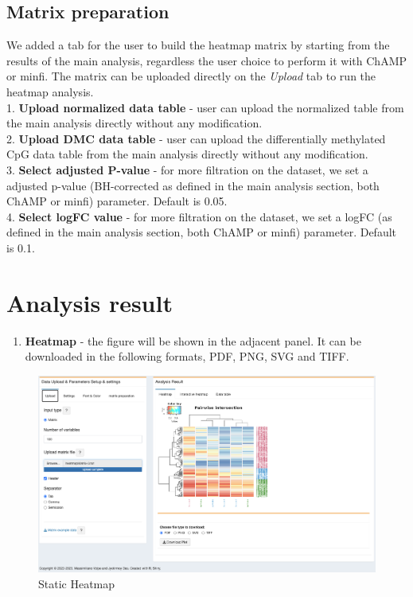 \documentclass[
  a4paper,
  oneside,
  open=any]{scrreport}
\providecommand{\tightlist}{%
  \setlength{\itemsep}{0pt}\setlength{\parskip}{0pt}}\usepackage{longtable,booktabs,array}
\begin{document}
\hypertarget{matrix-preparation}{%
\subsection{Matrix preparation}\label{matrix-preparation}}

We added a tab for the user to build the heatmap matrix by starting from
the results of the main analysis, regardless the user choice to perform
it with ChAMP or minfi. The matrix can be uploaded directly on the
\emph{Upload} tab to run the heatmap analysis.\\
1. \textbf{Upload normalized data table} - user can upload the
normalized table from the main analysis directly without any
modification.\\
2. \textbf{Upload DMC data table} - user can upload the differentially
methylated CpG data table from the main analysis directly without any
modification.\\
3. \textbf{Select adjusted P-value} - for more filtration on the
dataset, we set a adjusted p-value (BH-corrected as defined in the main
analysis section, both ChAMP or minfi) parameter. Default is 0.05.\\
4. \textbf{Select logFC value} - for more filtration on the dataset, we
set a logFC (as defined in the main analysis section, both ChAMP or
minfi) parameter. Default is 0.1.

\hypertarget{analysis-result-1}{%
\section{Analysis result}\label{analysis-result-1}}

\begin{enumerate}
\def\labelenumi{\arabic{enumi}.}
\tightlist
\item
  \textbf{Heatmap} - the figure will be shown in the adjacent panel. It
  can be downloaded in the following formats, PDF, PNG, SVG and TIFF.\\
\end{enumerate}

\begin{figure}[H]

{\centering \includegraphics{./_images/heatmap.png}

}

\caption{Static Heatmap}

\end{figure}
\end{document}
